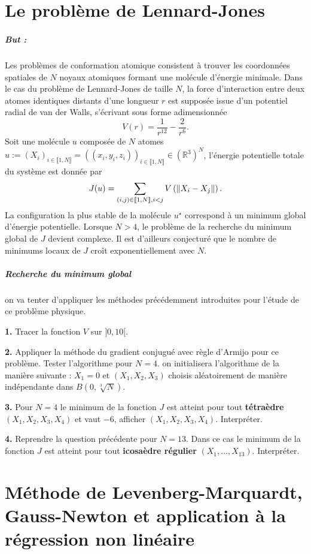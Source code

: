 \documentclass[a4paper,french,12pt]{article}
\begin{document}
\section{Le problème de Lennard-Jones} 
\subparagraph{But :} Les problèmes de conformation atomique consistent à trouver les coordonnées spatiales de $N$ noyaux atomiques formant une molécule d'énergie minimale. Dans le cas du problème de 
Lennard-Jones de taille $N$, la force d'interaction entre
deux atomes identiques distants d'une longueur $r$ est supposée issue d'un potentiel radial de van der Walls, s'écrivant sous forme adimensionnée 
\[
V(r) = \frac{1}{r^{12}} - \frac{2}{r^6}.
\]
Soit une molécule $u$ composée de $N$ atomes $u := (X_i)_{i \in \llbracket 1,N \rrbracket} = \left((x_i,y_i,z_i)\right)_{i \in \llbracket 1,N \rrbracket} \in \left(\mathbb{R}^3 \right)^N$, l'énergie potentielle totale du système est donnée par
\[
J(u) = \sum_{(i,j) \in \llbracket 1,N \rrbracket, \\ i<j} V\left(\|X_i-X_j\|\right).
\]
La configuration la plus stable de la molécule $u^\star$ correspond à un minimum global d'énergie
potentielle. %
Lorsque $N>4$, le problème de la recherche du minimum global de $J$ devient
complexe. Il est d'ailleurs conjecturé que le nombre de minimums locaux de $J$ croît exponentiellement avec $N$.

\subparagraph{Recherche du minimum global} on va tenter d'appliquer les méthodes précédemment introduites pour l'étude de ce problème physique.

\textbf{1.} Tracer la fonction $V$ sur $]0,10[$.

\textbf{2.} Appliquer la méthode du gradient conjugué avec règle d'Armijo pour ce problème. Tester l'algorithme pour $N = 4$. on initialisera l'algorithme de la manière suivante : $X_1 = 0$ et $(X_1,X_2,X_3)$ choisis aléatoirement de manière indépendante dans $B(0, \sqrt[3]{N})$. 

\textbf{3.} Pour $N = 4$ le minimum de la fonction $J$ est atteint pour tout \textbf{tétraèdre} $(X_1,X_2,X_3,X_4)$ et vaut $-6$, afficher $(X_1,X_2,X_3,X_4)$. Interpréter.

\textbf{4.} Reprendre la question précédente pour $N = 13$. Dans ce cas le minimum de la fonction $J$ est atteint pour tout \textbf{icosaèdre régulier} $(X_1, \dots, X_{13})$. Interpréter.
\section{Méthode de Levenberg-Marquardt, Gauss-Newton et application à la régression non linéaire}
%
\end{document}
